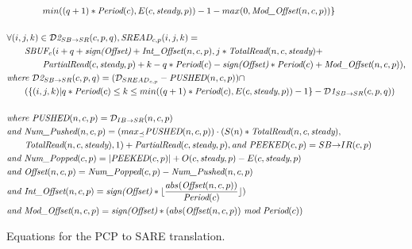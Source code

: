 \begin{figure}[p]
{\begin{minipage}{6.3in}
\begin{itemize}
\begin{align}
	&~~~~~~~~~~~~min((q+1)*\mt{Period}(c),
         E(c, \mt{steady}, p)) - 1 
         - max(0, \mt{Mod\_Offset}(n,c,p)) \}\\ \nonumber\\
\label{sbuf2sread1}
%
%
&\forall (i,j,k) \in {{\cal D}\mt{2}}_{SB {\small \rightarrow} SR}(c,p,q),
\mt{SREAD}_{c, p}(i,j,k) = \nonumber\\
    &~~~~~~\mt{SBUF}_{c}(i+q+
                  \mt{sign(Offset)} + \mt{Int\_Offset}(n,c,p),
                  j*\mt{TotalRead}(n,c,\mt{steady}) + \\\nonumber
                    &~~~~~~~~~~~~\mt{PartialRead}(c,\mt{steady},p)
		+ k
                   - q * \mt{Period}(c) 
                   - \mt{sign(Offset)} * \mt{Period}(c)
 + \mt{Mod\_Offset}(n,c,p)),\\ \nonumber&
\mt{where }{{\cal D}\mt{2}}_{SB {\small \rightarrow} SR}(c,p,q) = 
  ({\cal D}_{{SREAD}_{c, p}} - \mt{PUSHED}(n,c,p)) \cap \\ \nonumber
                         &~~~~~~( \{ (i,j,k) | q * \mt{Period}(c)
                                \le k 
                                \le min((q+1)*\mt{Period}(c),
                                              E(c, \mt{steady}, p)) - 1 \} - {{\cal D}\mt{1}}_{SB {\small \rightarrow} SR}(c,p,q) )\\ \nonumber\\
\label{sbuf2sread2}
%
%
&\mt{where }\mt{PUSHED}(n,c,p) = {\cal D}_{IB {\small \rightarrow} SR}(n,c,p) \nonumber\\ \nonumber
&\mt{and }\mt{Num\_Pushed}(n,c,p) = 
  (max_{\preceq}\mt{PUSHED}(n,c,p)) \cdot (S(n) * \mt{TotalRead}(n,c,\mt{steady}), \\ \nonumber
                                        &~~~~~~\mt{TotalRead}(n,c,\mt{steady}),
                                        1 ) + \mt{PartialRead}(c, \mt{steady}, p),
\mt{and }\mt{PEEKED}(c,p) = {SB {\small \rightarrow} IR}(c,p) \\ \nonumber
&\mt{and }\mt{Num\_Popped}(c,p) = |\mt{PEEKED}(c,p)| + O(c,\mt{steady},p) - E(c,\mt{steady},p) \\
&\mt{and }\mt{Offset}(n,c,p) = \mt{Num\_Popped}(c,p)-\mt{Num\_Pushed}(n,c,p) \\ \nonumber
&\mt{and }\mt{Int\_Offset}(n,c,p) = \mt{sign(Offset)}*\lfloor \frac{abs(\mt{Offset}(n,c,p))}{\mt{Period}(c)} \rfloor) \\ \nonumber
&\mt{and }\mt{Mod\_Offset}(n,c,p) = \mt{sign(Offset)}*(abs(\mt{Offset}(n,c,p))~\mt{mod}~\mt{Period}(c))
%
\end{align}
%
\end{itemize}
\end{minipage}}
\caption{Equations for the PCP to SARE translation.
\protect\label{fig:pcptosare3}}
\end{figure}